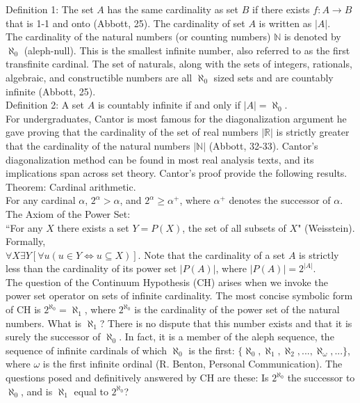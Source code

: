 \documentclass[10pt,letterpaper]{amsart}
\numberwithin{equation}{section}
\theoremstyle{plain}
\theoremstyle{definition}
\numberwithin{equation}{section}
\begin{document}
\noindent Definition 1:
The set $A$ has the same cardinality as set $B$ if there exists $f:A\rightarrow B$ that is 1-1 and onto (Abbott, 25). The cardinality of set $A$ is written as $|A|$.\\

The cardinality of the natural numbers (or counting numbers) $\mathbb{N}$ is denoted by $\aleph_0$ (aleph-null). This is the smallest infinite number, also referred to as the first transfinite cardinal. The set of naturals, along with the sets of integers, rationals, algebraic, and constructible numbers are all $\aleph_0$ sized sets and are countably infinite (Abbott, 25). \\

\noindent Definition 2:
A set $A$ is countably infinite if and only if $|A|=\aleph_0$. \\

For undergraduates, Cantor is most famous for the diagonalization argument he gave proving that the cardinality of the set of real numbers $|\mathbb{R}|$ is strictly greater that the cardinality of the natural numbers $|\mathbb{N}|$ (Abbott, 32-33). Cantor's diagonalization method can be found in most real analysis texts, and its implications span across set theory. Cantor's proof provide the following results.\\

\noindent Theorem: Cardinal arithmetic. \\
For any cardinal $\alpha$, $2^\alpha>\alpha$, and $2^\alpha \geq \alpha^+$, where $\alpha^+$ denotes the successor of $\alpha$. \\

\noindent The Axiom of the Power Set: \\
``For any $X$ there exists a set $Y=P(X)$, the set of all subsets of $X$" (Weisstein). Formally, \\ $\forall X \exists Y \left[ \forall u(u\in Y \iff u \subseteq X) \right] $. 
Note that the cardinality of a set $A$ is strictly less than the cardinality of its power set $|P(A)|$, where $|P(A)|=2^{|A|}$. \\

The question of the Continuum Hypothesis (CH) arises when we invoke the power set operator on sets of infinite cardinality. The most concise symbolic form of CH is $2^{\aleph_0}=\aleph_1$, where $2^{\aleph_0}$ is the cardinality of the power set of the natural numbers. What is $\aleph_1$? There is no dispute that this number exists and that it is surely the successor of $\aleph_0$. In fact, it is a member of the aleph sequence, the sequence of infinite cardinals of which $\aleph_0$ is the first: $\{ \aleph_0, \aleph_1, \aleph_2, ..., \aleph_\omega, ...\}$, where $\omega$ is the first infinite ordinal (R. Benton, Personal Communication). The questions posed and definitively answered by CH are these: Is $2^{\aleph_0}$ the successor to $\aleph_0$, and is  $\aleph_1$ equal to $2^{\aleph_0}$? \\
\end{document}
